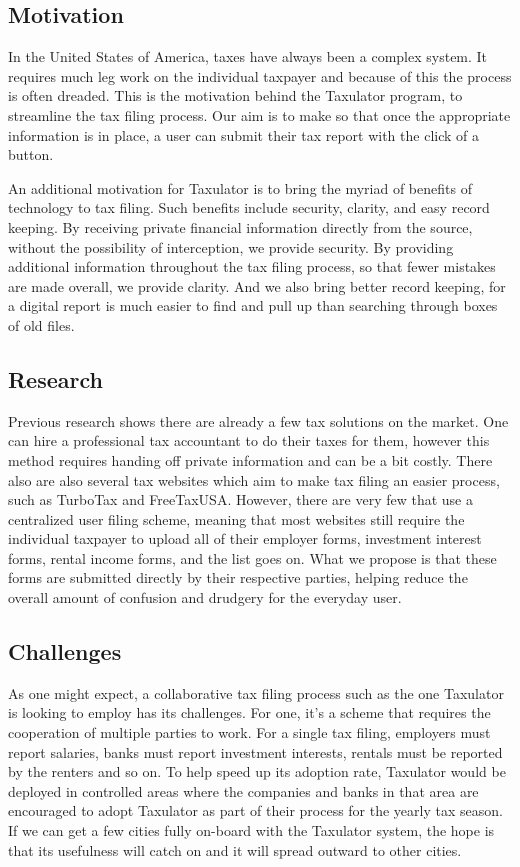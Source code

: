 \documentclass[sigconf]{acmart}
\begin{document}
\subsection{Motivation}
In the United States of America, taxes have always been a complex system. It requires much leg work on the individual taxpayer and because of this the process is often dreaded. This is the motivation behind the Taxulator program, to streamline the tax filing process. Our aim is to make so that once the appropriate information is in place, a user can submit their tax report with the click of a button.

An additional motivation for Taxulator is to bring the myriad of benefits of technology to tax filing. Such benefits include security, clarity, and easy record keeping. By receiving private financial information directly from the source, without the possibility of interception, we provide security. By providing additional information throughout the tax filing process, so that fewer mistakes are made overall, we provide clarity. And we also bring better record keeping, for a digital report is much easier to find and pull up than searching through boxes of old files.

\subsection{Research}
Previous research shows there are already a few tax solutions on the market. One can hire a professional tax accountant to do their taxes for them, however this method requires handing off private information and can be a bit costly. There also are also several tax websites which aim to make tax filing an easier process, such as TurboTax and FreeTaxUSA. However, there are very few that use a centralized user filing scheme, meaning that most websites still require the individual taxpayer to upload all of their employer forms, investment interest forms, rental income forms, and the list goes on. What we propose is that these forms are submitted directly by their respective parties, helping reduce the overall amount of confusion and drudgery for the everyday user.

\subsection{Challenges}
As one might expect, a collaborative tax filing process such as the one Taxulator is looking to employ has its challenges. For one, it’s a scheme that requires the cooperation of multiple parties to work. For a single tax filing, employers must report salaries, banks must report investment interests, rentals must be reported by the renters and so on. To help speed up its adoption rate, Taxulator would be deployed in controlled areas where the companies and banks in that area are encouraged to adopt Taxulator as part of their process for the yearly tax season. If we can get a few cities fully on-board with the Taxulator system, the hope is that its usefulness will catch on and it will spread outward to other cities.
\end{document}
